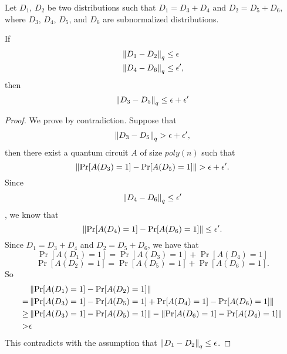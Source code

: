 \begin{lem}\label{lem:computational-triangle}
Let $D_1$, $D_2$ be two distributions such that $D_1=D_3+D_4$ and $D_2=D_5+D_6$, where $D_3$, $D_4$, $D_5$, and $D_6$ are subnormalized distributions.

If 
\begin{align}
    &\left\lVert D_1 - D_2\right\rVert_q \leq \epsilon   \\ 
    &\left\lVert D_4 - D_6\right\rVert_q \leq \epsilon',  
\end{align}
then 
\begin{align}
   \left\lVert D_3 - D_5\right\rVert_q \leq \epsilon+\epsilon' 
\end{align}
\end{lem}
\begin{proof}


We prove by contradiction. Suppose that
$$\left\lVert D_3 - D_5\right\rVert_q > \epsilon+\epsilon',$$
then there exist a quantum circuit $A$ of size $poly(n)$ such that 
$$\left\|\Pr[A({D_3})=1]-\Pr[A({D_5})=1]  \right\| > \epsilon+\epsilon'.$$
Since $$\left\lVert D_4 - D_6\right\rVert_q \leq \epsilon'$$, we know that 
$$\left\|\Pr[A({D_4})=1]-\Pr[A({D_6})=1]  \right\| \leq \epsilon'.$$
Since $D_1=D_3+D_4$ and $D_2=D_5+D_6$, we have that
$$ \Pr[A({D_1})=1]= \Pr[A({D_3})=1]+ \Pr[A({D_4})=1]$$ 
$$ \Pr[A({D_2})=1]= \Pr[A({D_5})=1]+ \Pr[A({D_6})=1].$$ 
So 
\begin{align}
    &\left\|\Pr[A({D_1})=1]-\Pr[A({D_2})=1]  \right\| \nonumber \\
    =&   \left\|\Pr[A({D_3})=1]-\Pr[A({D_5})=1] +\Pr[A({D_4})=1]-\Pr[A({D_6})=1]  \right\| \nonumber \\
    \geq  &\left\|\Pr[A({D_3})=1]-\Pr[A({D_5})=1]  \right\| - \left\|\Pr[A({D_6})=1]-\Pr[A({D_4})=1]  \right\|  \nonumber \\
     > &\epsilon 
\end{align}
This contradicts with the assumption that $\left\lVert D_1 - D_2\right\rVert_q \leq \epsilon $.
\end{proof}




